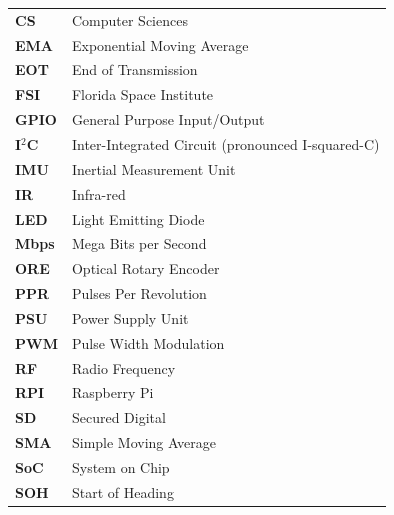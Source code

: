 \begin{table}[H]
\raggedright
{}
\begin{tabular}{>{\bfseries}L{2cm}L{13.65cm}}
CS  	& Computer Sciences		  							\\
EMA     & Exponential Moving Average                        \\
EOT     & End of Transmission                               \\
FSI  	& Florida Space Institute		  					\\
GPIO    & General Purpose Input/Output                      \\
I$^2$C  & Inter-Integrated Circuit (pronounced I-squared-C) \\
IMU     & Inertial Measurement Unit                         \\
IR      & Infra-red                                         \\
LED     & Light Emitting Diode                              \\
Mbps    & Mega Bits per Second                              \\
ORE     & Optical Rotary Encoder                            \\
PPR     & Pulses Per Revolution                             \\
PSU     & Power Supply Unit                                 \\
PWM     & Pulse Width Modulation                            \\
RF      & Radio Frequency                                   \\
RPI     & Raspberry Pi                                      \\
SD      & Secured Digital                                   \\
SMA     & Simple Moving Average                             \\
SoC     & System on Chip                                    \\
SOH     & Start of Heading                                  \\
\end{tabular}
\end{table}

